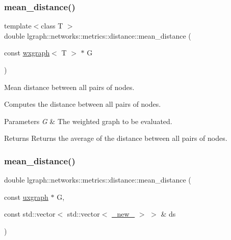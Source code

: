 \subsubsection{\texorpdfstring{mean\+\_\+distance()}{mean\_distance()}\hspace{0.1cm}{\footnotesize\ttfamily [2/4]}}
{\footnotesize\ttfamily template$<$class T $>$ \\
double lgraph\+::networks\+::metrics\+::distance\+::mean\+\_\+distance (\begin{DoxyParamCaption}\item[{const \hyperlink{classlgraph_1_1wxgraph}{wxgraph}$<$ T $>$ $\ast$}]{G }\end{DoxyParamCaption})}



Mean distance between all pairs of nodes. 

Computes the distance between all pairs of nodes.


\begin{DoxyParams}{Parameters}
{\em G} & The weighted graph to be evaluated. \\
\hline
\end{DoxyParams}
\begin{DoxyReturn}{Returns}
Returns the average of the distance between all pairs of nodes. 
\end{DoxyReturn}
\mbox{\label{namespacelgraph_1_1networks_1_1metrics_1_1distance_a501153c967f84ced065825927d2d5243}} 
\subsubsection{\texorpdfstring{mean\+\_\+distance()}{mean\_distance()}\hspace{0.1cm}{\footnotesize\ttfamily [3/4]}}
{\footnotesize\ttfamily double lgraph\+::networks\+::metrics\+::distance\+::mean\+\_\+distance (\begin{DoxyParamCaption}\item[{const \hyperlink{classlgraph_1_1uxgraph}{uxgraph} $\ast$}]{G,  }\item[{const std\+::vector$<$ std\+::vector$<$ \hyperlink{namespacelgraph_a2836f966c1c36b43da337d8907728ec0}{\+\_\+new\+\_\+} $>$ $>$ \&}]{ds }\end{DoxyParamCaption})}



